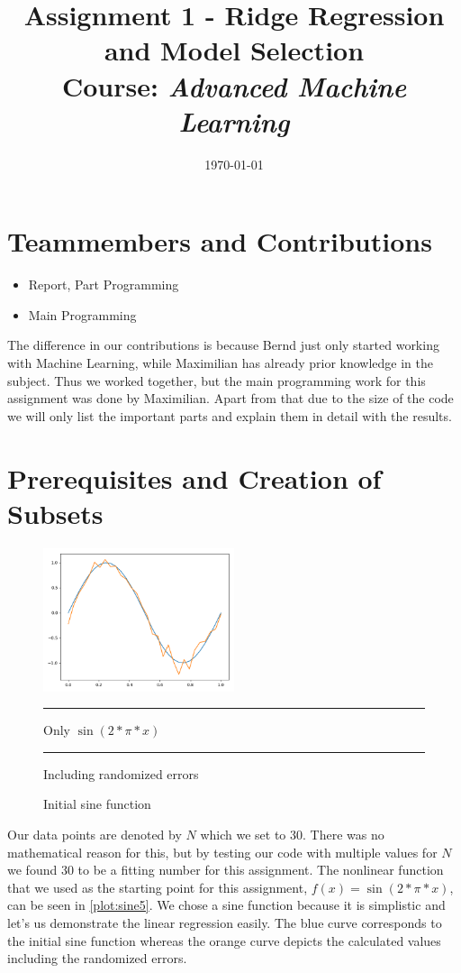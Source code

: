 \documentclass{article}
\title{Assignment 1 - Ridge Regression and Model Selection\\
		{\large Course: \textit{Advanced Machine Learning}}}
\date{\today}
\newcommand{\sqboxs}{1.2ex}%
\newcommand{\sqbox}[1]{\textcolor{#1}{\rule{\sqboxs}{\sqboxs}}}
\begin{document}
\maketitle

\section{Teammembers and Contributions}
\label{sec:TeammembersAndContributions}

\begin{itemize}
	\item {} Report, Part Programming
	\item {} Main Programming
\end{itemize}

\noindent The difference in our contributions is because Bernd just only started working with Machine Learning, while Maximilian has already prior knowledge in the subject. Thus we worked together, but the main programming work for this assignment was done by Maximilian. Apart from that due to the size of the code we will only list the important parts and explain them in detail with the results. 

\section{Prerequisites and Creation of Subsets} 
\label{sec:PrerequisitesAndCreationOfSubsets}
\begin{figure} %
	\centering
	\includegraphics[width=0.5\textwidth]{plots/sine5.png}
	\caption{Initial sine function}
	\sqbox{clightblue} Only $\sin(2*\pi*x)$\\
	\sqbox{corange} Including randomized errors
	\label{plot:sine5}
\end{figure}

Our data points are denoted by $N$ which we set to 30. There was no mathematical reason for this, but by testing our code with multiple values for $N$ we found 30 to be a fitting number for this assignment. The nonlinear function that we used as the starting point for this assignment, $f(x) = \sin(2*\pi*x)$, can be seen in \autoref{plot:sine5}. We chose a sine function because it is simplistic and let's us demonstrate the linear regression easily. The blue curve corresponds to the initial sine function whereas the orange curve depicts the calculated values including the randomized errors. \\
\end{document}
